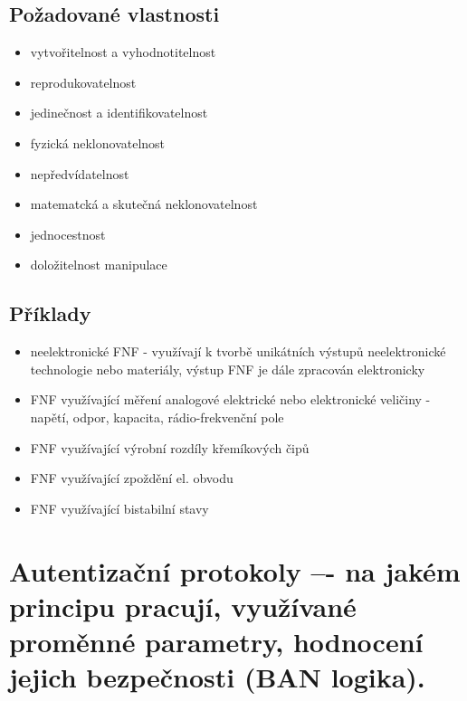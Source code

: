 \subsection{Požadované vlastnosti}
\begin{itemize}
    \item vytvořitelnost a vyhodnotitelnost
    \item reprodukovatelnost
    \item jedinečnost a identifikovatelnost
    \item fyzická neklonovatelnost
    \item nepředvídatelnost
    \item matematcká a skutečná neklonovatelnost
    \item jednocestnost
    \item doložitelnost manipulace
\end{itemize}

\subsection{Příklady}
\begin{itemize}
    \item neelektronické FNF - využívají k tvorbě unikátních výstupů neelektronické technologie nebo materiály, výstup FNF je dále zpracován elektronicky
    \item FNF využívající měření analogové elektrické nebo elektronické veličiny - napětí, odpor, kapacita, rádio-frekvenční pole
    \item FNF využívající výrobní rozdíly křemíkových čipů
    \item FNF využívající zpoždění el. obvodu
    \item FNF využívající bistabilní stavy
\end{itemize}

\clearpage
\section{Autentizační protokoly –- na jakém principu pracují, využívané proměnné parametry, hodnocení jejich bezpečnosti (BAN logika).}
